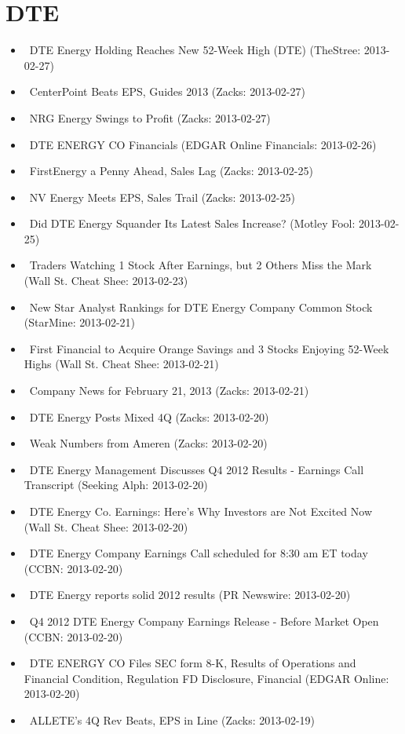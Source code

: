 \documentclass[11pt,asymmetric]{article}
\begin{document}
\section*{DTE}
\begin{itemize}
\item\ DTE Energy Holding Reaches New 52-Week High (DTE) (TheStree: 2013-02-27)
\item\ CenterPoint Beats EPS, Guides 2013 (Zacks: 2013-02-27)
\item\ NRG Energy Swings to Profit (Zacks: 2013-02-27)
\item\ DTE ENERGY CO Financials (EDGAR Online Financials: 2013-02-26)
\item\ FirstEnergy a Penny Ahead, Sales Lag (Zacks: 2013-02-25)
\item\ NV Energy Meets EPS, Sales Trail (Zacks: 2013-02-25)
\item\ Did DTE Energy Squander Its Latest Sales Increase? (Motley Fool: 2013-02-25)
\item\ Traders Watching 1 Stock After Earnings, but 2 Others Miss the Mark (Wall St. Cheat Shee: 2013-02-23)
\item\ New Star Analyst Rankings for DTE Energy Company Common Stock (StarMine: 2013-02-21)
\item\ First Financial to Acquire Orange Savings and 3 Stocks Enjoying 52-Week Highs (Wall St. Cheat Shee: 2013-02-21)
\item\ Company News for February 21, 2013 (Zacks: 2013-02-21)
\item\ DTE Energy Posts Mixed 4Q (Zacks: 2013-02-20)
\item\ Weak Numbers from Ameren (Zacks: 2013-02-20)
\item\ DTE Energy Management Discusses Q4 2012 Results - Earnings Call Transcript (Seeking Alph: 2013-02-20)
\item\ DTE Energy Co. Earnings: Here’s Why Investors are Not Excited Now (Wall St. Cheat Shee: 2013-02-20)
\item\ DTE Energy Company Earnings Call scheduled for 8:30 am ET today (CCBN: 2013-02-20)
\item\ DTE Energy reports solid 2012 results (PR Newswire: 2013-02-20)
\item\ Q4 2012 DTE Energy Company Earnings Release - Before Market Open (CCBN: 2013-02-20)
\item\ DTE ENERGY CO Files SEC form 8-K, Results of Operations and Financial Condition, Regulation FD Disclosure, Financial (EDGAR Online: 2013-02-20)
\item\ ALLETE's 4Q Rev Beats, EPS in Line (Zacks: 2013-02-19)

\end{itemize}
\end{document}
